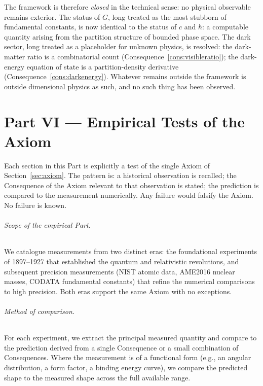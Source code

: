 \documentclass[11pt,twocolumn,a4paper]{article}
\theoremstyle{axiomstyle}
\theoremstyle{conseqstyle}
\theoremstyle{definition}
\theoremstyle{remark}
\begin{document}
The framework is therefore \emph{closed} in the technical sense: no physical observable remains exterior. The status of $G$, long treated as the most stubborn of fundamental constants, is now identical to the status of $c$ and $\hbar$: a computable quantity arising from the partition structure of bounded phase space. The dark sector, long treated as a placeholder for unknown physics, is resolved: the dark-matter ratio is a combinatorial count (Consequence~\ref{cons:visibleratio}); the dark-energy equation of state is a partition-density derivative (Consequence~\ref{cons:darkenergy}). Whatever remains outside the framework is outside dimensional physics as such, and no such thing has been observed.

\clearpage

\part*{Part VI --- Empirical Tests of the Axiom}

Each section in this Part is explicitly a test of the single Axiom of Section~\ref{sec:axiom}. The pattern is: a historical observation is recalled; the Consequence of the Axiom relevant to that observation is stated; the prediction is compared to the measurement numerically. Any failure would falsify the Axiom. No failure is known.

\paragraph{Scope of the empirical Part.} We catalogue measurements from two distinct eras: the foundational experiments of 1897--1927 that established the quantum and relativistic revolutions, and subsequent precision measurements (NIST atomic data, AME2016 nuclear masses, CODATA fundamental constants) that refine the numerical comparisons to high precision. Both eras support the same Axiom with no exceptions.

\paragraph{Method of comparison.} For each experiment, we extract the principal measured quantity and compare to the prediction derived from a single Consequence or a small combination of Consequences. Where the measurement is of a functional form (e.g., an angular distribution, a form factor, a binding energy curve), we compare the predicted shape to the measured shape across the full available range.
\end{document}
